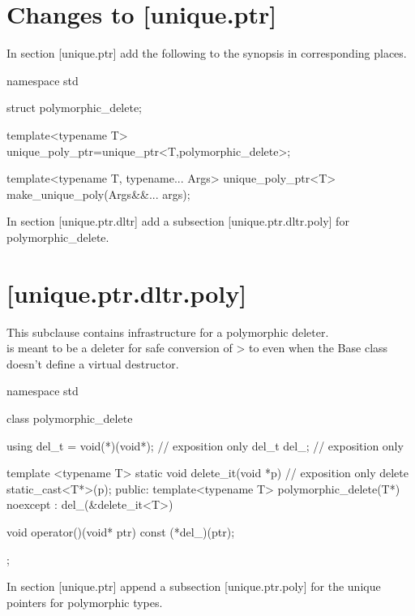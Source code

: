 \documentclass[ebook,11pt,article]{memoir}
\begin{document}
\section{Changes to [unique.ptr] }
In section [unique.ptr] add the following to the  synopsis in corresponding places.

\begin{codeblock}
namespace std{

struct polymorphic_delete;

template<typename T>
unique_poly_ptr=unique_ptr<T,polymorphic_delete>;

template<typename T, typename... Args>
unique_poly_ptr<T> make_unique_poly(Args&&... args);

}
\end{codeblock}

In section [unique.ptr.dltr] add a subsection [unique.ptr.dltr.poly] for polymorphic_delete.

\section{ [unique.ptr.dltr.poly]}
\pnum
This subclause contains infrastructure for a polymorphic deleter.\\

\pnum
\enternote
{} is meant to be a deleter for safe conversion of > to  even when the Base class doesn't define a virtual destructor.
\exitnote

\begin{codeblock}
namespace std{

class polymorphic_delete{
   using del_t = void(*)(void*); // exposition only
   del_t del_; // exposition only
 
   template <typename T>
   static void delete_it(void *p) // exposition only
   {
      delete static_cast<T*>(p);
   }
public:
   template<typename T>
   polymorphic_delete(T*) noexcept
     : del_(&delete_it<T>)
   {}
 
   void operator()(void* ptr) const
   {
     (*del_)(ptr);
   }

};
}
\end{codeblock}


In section [unique.ptr] append a subsection [unique.ptr.poly] for the unique pointers for polymorphic types.

\end{document}
